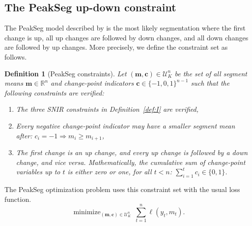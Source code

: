\documentclass{article}
\newtheorem{definition}{Definition}
\DeclareMathOperator*{\minimize}{minimize}
\newcommand{\RR}{\mathbb R}
\begin{document}
\subsection{The PeakSeg up-down constraint}
\label{sec:PeakSeg}

The PeakSeg model described by \citet{HOCKING-PeakSeg} is the most
likely segmentation where the first change is up, all up changes are
followed by down changes, and all down changes are followed by up
changes. More precisely, we define the constraint set as follows.
\begin{definition}[PeakSeg constraints]
  \label{def:U}
  Let $(\mathbf m, \mathbf c)\in\mathcal U_K^n$ be the set of all
  segment means $\mathbf m\in\RR^n$ and change-point indicators
  $\mathbf c\in\{-1, 0,1\}^{n-1}$ such that the following constraints
  are verified:
  \begin{enumerate}
  \item The three SNIR constraints in Definition~\ref{def:I} are verified,
  \item Every negative change-point indicator may have a smaller
    segment mean after:
    $c_i = -1 \Rightarrow m_i \geq m_{i+1}$,
  \item The first change is an up change, and every up change is followed by a
    down change, and vice versa. Mathematically, the cumulative sum of
    change-point variables up to $t$ is either zero or one, for all $t<n$:
    $\sum_{i=1}^t c_i \in \{0, 1\}$.
  \end{enumerate}
\end{definition}
The PeakSeg optimization problem uses this constraint set with the usual loss function. 
\begin{equation}
\label{eq:min_PeakSeg}
    \minimize_{
        (\mathbf m, \mathbf c)\in\mathcal U^n_K
      } \ 
\sum_{t=1}^n \ell(y_t, m_t).
\end{equation}
\end{document}
